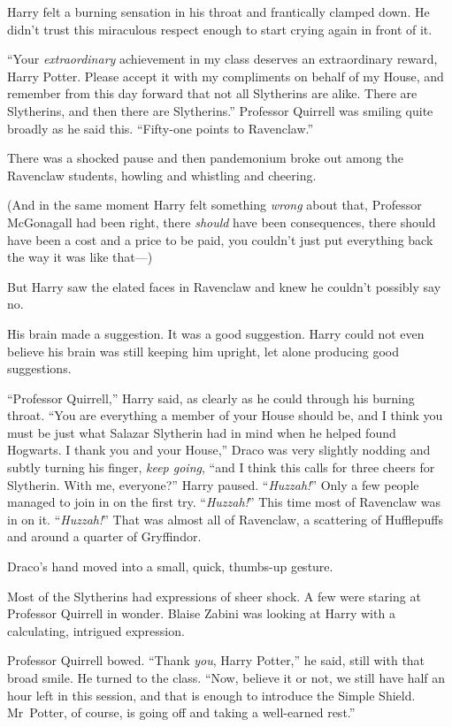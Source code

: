 Harry felt a burning sensation in his throat and frantically clamped down. He didn’t trust this miraculous respect enough to start crying again in front of it.

“Your \emph{extraordinary} achievement in my class deserves an extraordinary reward, Harry Potter. Please accept it with my compliments on behalf of my House, and remember from this day forward that not all Slytherins are alike. There are Slytherins, and then there are Slytherins.” Professor Quirrell was smiling quite broadly as he said this. “Fifty-one points to Ravenclaw.”

There was a shocked pause and then pandemonium broke out among the Ravenclaw students, howling and whistling and cheering.

(And in the same moment Harry felt something \emph{wrong} about that, Professor McGonagall had been right, there \emph{should} have been consequences, there should have been a cost and a price to be paid, you couldn’t just put everything back the way it was like that—)

But Harry saw the elated faces in Ravenclaw and knew he couldn’t possibly say no.

His brain made a suggestion. It was a good suggestion. Harry could not even believe his brain was still keeping him upright, let alone producing good suggestions.

“Professor Quirrell,” Harry said, as clearly as he could through his burning throat. “You are everything a member of your House should be, and I think you must be just what Salazar Slytherin had in mind when he helped found Hogwarts. I thank you and your House,” Draco was very slightly nodding and subtly turning his finger, \emph{keep going}, “and I think this calls for three cheers for Slytherin. With me, everyone?” Harry paused. “\emph{Huzzah!}” Only a few people managed to join in on the first try. “\emph{Huzzah!}” This time most of Ravenclaw was in on it. “\emph{Huzzah!}” That was almost all of Ravenclaw, a scattering of Hufflepuffs and around a quarter of Gryffindor.

Draco’s hand moved into a small, quick, thumbs-up gesture.

Most of the Slytherins had expressions of sheer shock. A few were staring at Professor Quirrell in wonder. Blaise Zabini was looking at Harry with a calculating, intrigued expression.

Professor Quirrell bowed. “Thank \emph{you}, Harry Potter,” he said, still with that broad smile. He turned to the class. “Now, believe it or not, we still have half an hour left in this session, and that is enough to introduce the Simple Shield. Mr~Potter, of course, is going off and taking a well-earned rest.”

